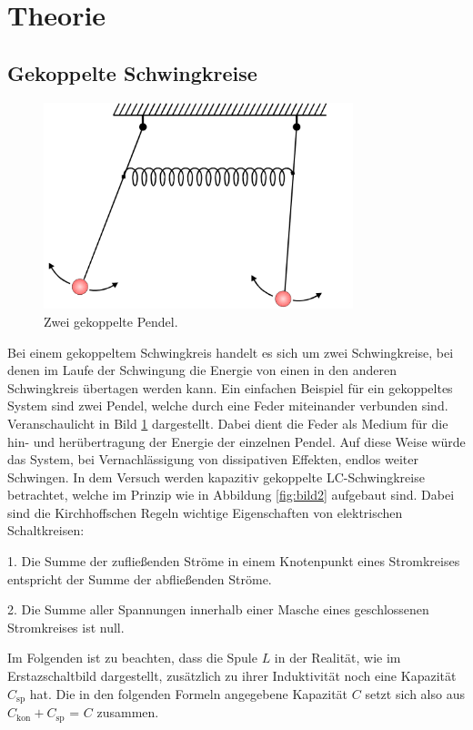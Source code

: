 \section{Theorie}
\label{sec:Theorie}

\subsection{Gekoppelte Schwingkreise} 
\label{sub:Gekoppelte Schwingkreise}


\begin{figure}

    \centering
    \includegraphics[height=6.0cm]{data/Bild1.png}
    \caption{Zwei gekoppelte Pendel.}
    \label{fig:bild1}
\end{figure}

Bei einem gekoppeltem Schwingkreis handelt es sich um zwei Schwingkreise, bei denen im Laufe der Schwingung
die Energie von einen in den anderen Schwingkreis übertagen werden kann. Ein einfachen Beispiel für ein gekoppeltes
System sind zwei Pendel, welche durch eine Feder miteinander verbunden sind. Veranschaulicht in Bild \ref{fig:bild1} dargestellt. Dabei dient die Feder als Medium für die hin- und herübertragung der Energie der einzelnen Pendel.
Auf diese Weise würde das System, bei Vernachlässigung von dissipativen Effekten, endlos weiter Schwingen.
In dem Versuch werden kapazitiv gekoppelte LC-Schwingkreise betrachtet, welche im Prinzip wie in Abbildung \ref{fig:bild2}
aufgebaut sind. Dabei sind die Kirchhoffschen Regeln wichtige Eigenschaften von elektrischen Schaltkreisen: 

1.  Die Summe der zufließenden Ströme in einem Knotenpunkt eines Stromkreises entspricht
    der Summe der abfließenden Ströme.

2.  Die Summe aller Spannungen innerhalb einer Masche eines geschlossenen Stromkreises
    ist null.


Im Folgenden ist zu beachten, dass die Spule $L$ in der Realität, wie im Erstazschaltbild dargestellt, zusätzlich zu ihrer Induktivität noch eine Kapazität
$C_\text{sp}$ hat. Die in den folgenden Formeln angegebene Kapazität $C$ setzt sich also aus $C_\text{kon} + C_\text{sp}$ = $C$ 
zusammen. 

